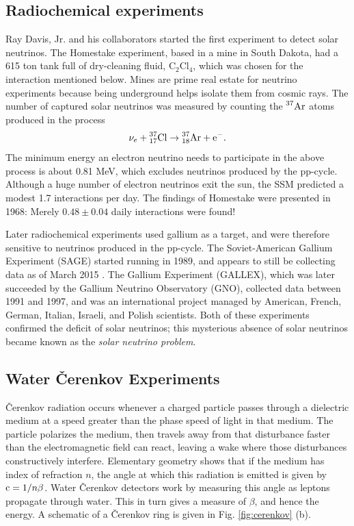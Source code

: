 \subsection{Radiochemical experiments}
Ray Davis, Jr. and his collaborators started the first experiment to detect
solar neutrinos. The Homestake experiment, based in a mine in South Dakota,
had a 615 ton tank full of dry-cleaning fluid, $\text{C}_2\text{Cl}_4$,
which was chosen for the interaction mentioned below.
Mines are prime real estate for neutrino experiments because being underground
helps isolate them from cosmic rays. The number of captured solar neutrinos
was measured by counting the $\prescript{37}{}{\text{Ar}}$ atoms produced in
the process
\begin{equation}
  \nu_e+\prescript{37}{17}{\text{Cl}}\to
        \prescript{37}{18}{\text{Ar}}+\text{e}^-.
\end{equation}
The minimum energy an electron neutrino needs to participate in the above
process is about 0.81 MeV, which excludes neutrinos produced by the pp-cycle.
Although a huge number of electron neutrinos exit the sun, the SSM
predicted a modest 1.7 interactions per day. The findings
of Homestake were presented in 1968: Merely $0.48\pm0.04$ daily interactions
were found!

Later radiochemical experiments used gallium as a target, and were therefore
sensitive to neutrinos produced in the pp-cycle. The Soviet-American
Gallium Experiment (SAGE) started running in 1989, and appears to still be
collecting data as of March 2015 \cite{gavrin_current_2015}. 
The Gallium Experiment (GALLEX),
which was later succeeded by the Gallium Neutrino Observatory (GNO),
collected data between 1991 and 1997, and was an international project
managed by American, French, German, Italian, Israeli, and Polish scientists.
Both of these experiments confirmed the deficit of solar neutrinos; this
mysterious absence of solar neutrinos became known as the {\it solar
neutrino problem}.

\subsection{Water \v{C}erenkov Experiments}
\v{C}erenkov radiation occurs whenever a charged particle passes through a
dielectric medium at a speed greater than the phase speed of light in that
medium. The particle polarizes the medium, then travels away from that
disturbance faster than the electromagnetic field can react, leaving
a wake where those disturbances constructively interfere. Elementary
geometry shows that if the medium has index of refraction $n$, the angle
at which this radiation is emitted is given by $\operatorname{c}=1/n\beta$. Water
\v{C}erenkov detectors work by measuring this angle as leptons propagate
through water. This in turn gives a measure of $\beta$, and hence the energy.
A schematic of a \v{C}erenkov ring is given in Fig. \ref{fig:cerenkov} (b).

